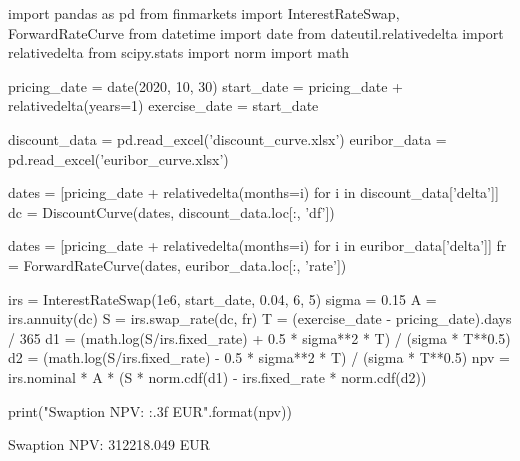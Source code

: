 \cprotEnv\begin{solution}
\begin{ipython}
import pandas as pd
from finmarkets import InterestRateSwap, ForwardRateCurve
from datetime import date
from dateutil.relativedelta import relativedelta
from scipy.stats import norm
import math

pricing_date = date(2020, 10, 30)
start_date = pricing_date + relativedelta(years=1)
exercise_date = start_date

discount_data = pd.read_excel('discount_curve.xlsx')
euribor_data = pd.read_excel('euribor_curve.xlsx')

dates = [pricing_date + relativedelta(months=i) for i in discount_data['delta']]
dc = DiscountCurve(dates, discount_data.loc[:, 'df'])

dates = [pricing_date + relativedelta(months=i) for i in euribor_data['delta']]
fr = ForwardRateCurve(dates, euribor_data.loc[:, 'rate'])


irs = InterestRateSwap(1e6, start_date, 0.04, 6, 5)
sigma = 0.15
A = irs.annuity(dc)
S = irs.swap_rate(dc, fr)
T = (exercise_date - pricing_date).days / 365
d1 = (math.log(S/irs.fixed_rate) + 0.5 * sigma**2 * T) / (sigma * T**0.5)
d2 = (math.log(S/irs.fixed_rate) - 0.5 * sigma**2 * T) / (sigma * T**0.5)
npv = irs.nominal * A * (S * norm.cdf(d1) - irs.fixed_rate * norm.cdf(d2))

print("Swaption NPV: {:.3f} EUR".format(npv))\end{ipython}
\begin{ioutput}
Swaption NPV: 312218.049 EUR
\end{ioutput}
\end{solution}

